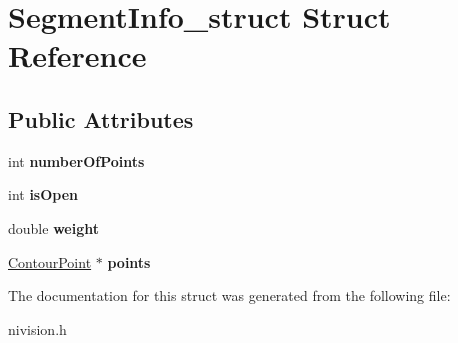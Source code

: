 \hypertarget{structSegmentInfo__struct}{\section{\-Segment\-Info\-\_\-struct \-Struct \-Reference}
\label{structSegmentInfo__struct}
}
\subsection*{\-Public \-Attributes}
\begin{DoxyCompactItemize}
\item 
\hypertarget{structSegmentInfo__struct_af0d058226f01f4082b868d6cff43fd7b}{int {\bfseries number\-Of\-Points}}\label{structSegmentInfo__struct_af0d058226f01f4082b868d6cff43fd7b}

\item 
\hypertarget{structSegmentInfo__struct_a415d6077e8882284021405fc0df5a9ae}{int {\bfseries is\-Open}}\label{structSegmentInfo__struct_a415d6077e8882284021405fc0df5a9ae}

\item 
\hypertarget{structSegmentInfo__struct_aa30c0a20dbea978a32ce5d4119c47010}{double {\bfseries weight}}\label{structSegmentInfo__struct_aa30c0a20dbea978a32ce5d4119c47010}

\item 
\hypertarget{structSegmentInfo__struct_a6c8749c4563fe27e2fd404b43e5d1348}{\hyperlink{structContourPoint__struct}{\-Contour\-Point} $\ast$ {\bfseries points}}\label{structSegmentInfo__struct_a6c8749c4563fe27e2fd404b43e5d1348}

\end{DoxyCompactItemize}


\-The documentation for this struct was generated from the following file\-:\begin{DoxyCompactItemize}
\item 
nivision.\-h\end{DoxyCompactItemize}

